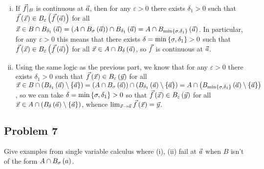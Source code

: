 \documentclass[main.tex]{subfiles}
\begin{document}
\begin{soln}
    \begin{enumerate}[(i)]
        \item If $\vec{f} |_B$ is continuous at $\vec{a}$, then for any $\varepsilon > 0$ there exists $\delta_1 > 0$ such that $\vec{f}\left( \vec{x} \right) \in B_\varepsilon\left( \vec{f}\left( \vec{a} \right) \right)$ for all $\vec{x}\in B\cap B_{\delta_1}\left( \vec{a} \right) = \left( A\cap B_\sigma\left( \vec{a} \right) \right)\cap B_{\delta_1}\left( \vec{a} \right) = A \cap B_{\min\left\{ \sigma, \delta_1 \right\}}\left( \vec{a} \right)$. In particular, for any $\varepsilon > 0$ this means that there exists $\delta = \min\left\{ \sigma, \delta_1 \right\} > 0$ such that $\vec{f}\left( \vec{x} \right) \in B_\varepsilon\left( \vec{f}\left( \vec{a} \right) \right)$ for all $\vec{x}\in A\cap B_\delta\left( \vec{a} \right)$, so $\vec{f}$ is continuous at $\vec{a}$.
        
        \item Using the same logic as the previous part, we know that for any $\varepsilon > 0$ there exists $\delta_1 > 0$ such that $\vec{f}\left( \vec{x} \right) \in B_\varepsilon\left( \vec{y} \right)$ for all $\vec{x}\in B\cap \left( B_{\delta_1}\left( \vec{a} \right)\setminus\left\{ \vec{a} \right\} \right) = \left( A\cap B_\sigma\left( \vec{a} \right) \right)\cap \left( B_{\delta_1}\left( \vec{a} \right)\setminus\left\{ \vec{a} \right\} \right) = A \cap \left( B_{\min\left\{ \sigma, \delta_1 \right\}}\left( \vec{a} \right)\setminus\left\{ \vec{a} \right\} \right)$, so we can take $\delta = \min\left\{ \sigma, \delta_1 \right\} > 0$ so that $\vec{f}\left( \vec{x} \right)\in B_\varepsilon\left( \vec{y} \right)$ for all $\vec{x}\in A\cap \left( B_\delta\left( \vec{a} \right)\setminus\left\{ \vec{a} \right\} \right)$, whence $\lim_{\vec{x}\to \vec{a}}\vec{f}\left( \vec{x} \right) = \vec{y}$.
    \end{enumerate}
\end{soln}
\eject

\subsection{Problem 7}
\begin{claim}
    Give examples from single variable calculus where (i), (ii) fail at $\vec{a}$ when $B$ isn’t of the form $A \cap B_\sigma\left( a \right)$.
\end{claim}
\end{document}
